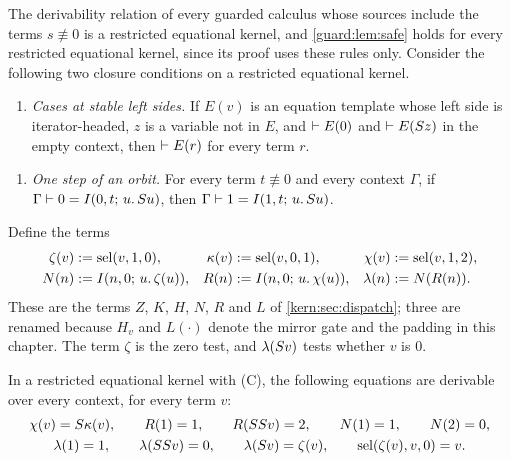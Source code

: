 The derivability relation of every guarded calculus whose sources include
the terms $s\not\equiv 0$ is a restricted equational kernel, and
\cref{guard:lem:safe} holds for every restricted equational kernel, since
its proof uses these rules only.  Consider the following two closure
conditions on a restricted equational kernel.
\begin{enumerate}[label=\textup{(\Alph*)},start=3]
\item \emph{Cases at stable left sides.}  If $E(v)$ is an equation template
 whose left side is iterator-headed, $z$ is a variable not in $E$, and
 $\vdash E(0)$ and $\vdash E(S z)$ in the empty context, then
 $\vdash E(r)$ for every term $r$.
\end{enumerate}
\begin{enumerate}[label=\textup{(\Alph*)},start=15]
\item \emph{One step of an orbit.}  For every term $t\not\equiv 0$ and every
 context $\Gamma$, if $\Gamma\vdash 0=I(0,t;\,u.\,S u)$, then
 $\Gamma\vdash 1=I(1,t;\,u.\,S u)$.
\end{enumerate}

Define the terms
\begin{align*}
 \zeta(v)&\mathrel{:=}\operatorname{sel}(v,1,0), & \kappa(v)&\mathrel{:=}\operatorname{sel}(v,0,1), &
 \chi(v)&\mathrel{:=}\operatorname{sel}(v,1,2),\\
 N(n)&\mathrel{:=}I(n,0;\,u.\,\zeta(u)), & R(n)&\mathrel{:=}I(n,0;\,u.\,\chi(u)), &
 \lambda(n)&\mathrel{:=} N(R(n)).
\end{align*}
These are the terms $Z$, $K$, $H$, $N$, $R$ and $L$ of
\cref{kern:sec:dispatch}; three are renamed because $H_v$ and $L(\cdot)$
denote the mirror gate and the padding in this chapter.  The term $\zeta$
is the zero test, and $\lambda(S v)$ tests whether $v$ is $0$.

\begin{lemma}
\label{guard:lem:tests}
In a restricted equational kernel with \textup{(C)}, the following equations
are derivable over every context, for every term $v$:
\begin{gather*}
 \chi(v)=S\kappa(v),\qquad R(1)=1,\qquad R(SS v)=2,\qquad
 N(1)=1,\qquad N(2)=0,\\
 \lambda(1)=1,\qquad\lambda(SS v)=0,\qquad
 \lambda(S v)=\zeta(v),\qquad
 \operatorname{sel}(\zeta(v),v,0)=v .
\end{gather*}
\end{lemma}

